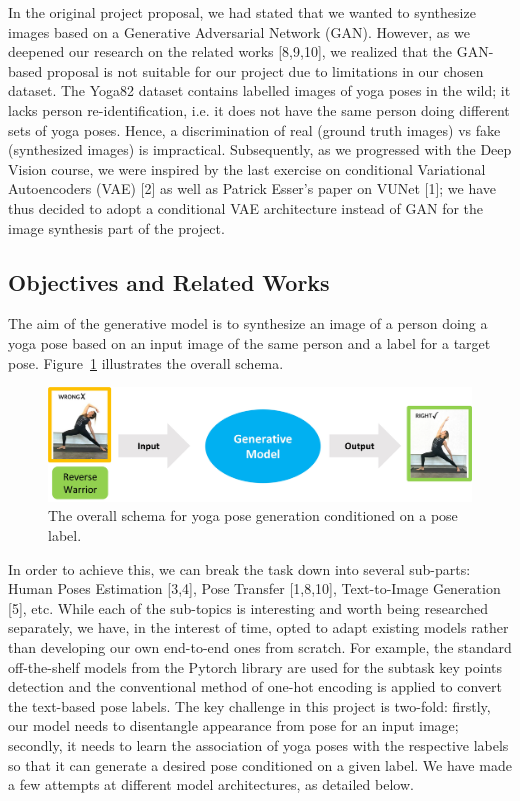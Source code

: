 \documentclass{article}
\begin{document}
In the original project proposal, we had stated that we wanted to synthesize images based on a Generative Adversarial Network (GAN). However, as we deepened our research on the related works [8,9,10], we realized that the GAN-based proposal is not suitable for our project due to limitations in our chosen dataset. The Yoga82 dataset contains labelled images of yoga poses in the wild; it lacks person re-identification, i.e. it does not have the same person doing different sets of yoga poses. Hence, a discrimination of real (ground truth images) vs fake (synthesized images) is impractical. Subsequently, as we progressed with the Deep Vision course, we were inspired by the last exercise on conditional Variational Autoencoders (VAE) [2] as well as Patrick Esser’s paper on VUNet [1]; we have thus decided to adopt a conditional VAE architecture instead of GAN for the image synthesis part of the project.

\subsection{Objectives and Related Works}
The aim of the generative model is to synthesize an image of a person doing a yoga pose based on an input image of the same person and a label for a target pose. Figure~\ref{fig:schema} illustrates the overall schema. 

\begin{figure}[!h]
    \centering
    \includegraphics[scale=0.11]{fig1.jpg}
    \caption{The overall schema for yoga pose generation conditioned on a pose label.}
    \label{fig:schema}
\end{figure}

\noindent
In order to achieve this, we can break the task down into several sub-parts: Human Poses Estimation [3,4], Pose Transfer [1,8,10], Text-to-Image Generation [5], etc. While each of the sub-topics is interesting and worth being researched separately, we have, in the interest of time, opted to adapt existing models rather than developing our own end-to-end ones from scratch. For example, the standard off-the-shelf models from the Pytorch library are used for the subtask key points detection and the conventional method of one-hot encoding is applied to convert the text-based pose labels.
\newline
\newline
The key challenge in this project is two-fold: firstly, our model needs to disentangle appearance from pose for an input image; secondly, it needs to learn the association of yoga poses with the respective labels so that it can generate a desired pose conditioned on a given label. We have made a few attempts at different model architectures, as detailed below.
\end{document}
